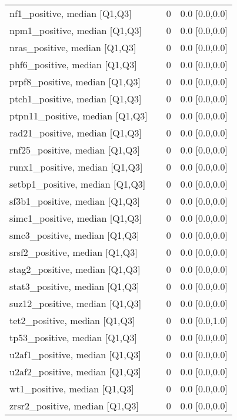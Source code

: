 \begin{tabular}{llll}
nf1\_positive, median [Q1,Q3] &    &      0 &     0.0 [0.0,0.0] \\
npm1\_positive, median [Q1,Q3] &    &      0 &     0.0 [0.0,0.0] \\
nras\_positive, median [Q1,Q3] &    &      0 &     0.0 [0.0,0.0] \\
phf6\_positive, median [Q1,Q3] &    &      0 &     0.0 [0.0,0.0] \\
prpf8\_positive, median [Q1,Q3] &    &      0 &     0.0 [0.0,0.0] \\
ptch1\_positive, median [Q1,Q3] &    &      0 &     0.0 [0.0,0.0] \\
ptpn11\_positive, median [Q1,Q3] &    &      0 &     0.0 [0.0,0.0] \\
rad21\_positive, median [Q1,Q3] &    &      0 &     0.0 [0.0,0.0] \\
rnf25\_positive, median [Q1,Q3] &    &      0 &     0.0 [0.0,0.0] \\
runx1\_positive, median [Q1,Q3] &    &      0 &     0.0 [0.0,0.0] \\
setbp1\_positive, median [Q1,Q3] &    &      0 &     0.0 [0.0,0.0] \\
sf3b1\_positive, median [Q1,Q3] &    &      0 &     0.0 [0.0,0.0] \\
simc1\_positive, median [Q1,Q3] &    &      0 &     0.0 [0.0,0.0] \\
smc3\_positive, median [Q1,Q3] &    &      0 &     0.0 [0.0,0.0] \\
srsf2\_positive, median [Q1,Q3] &    &      0 &     0.0 [0.0,0.0] \\
stag2\_positive, median [Q1,Q3] &    &      0 &     0.0 [0.0,0.0] \\
stat3\_positive, median [Q1,Q3] &    &      0 &     0.0 [0.0,0.0] \\
suz12\_positive, median [Q1,Q3] &    &      0 &     0.0 [0.0,0.0] \\
tet2\_positive, median [Q1,Q3] &    &      0 &     0.0 [0.0,1.0] \\
tp53\_positive, median [Q1,Q3] &    &      0 &     0.0 [0.0,0.0] \\
u2af1\_positive, median [Q1,Q3] &    &      0 &     0.0 [0.0,0.0] \\
u2af2\_positive, median [Q1,Q3] &    &      0 &     0.0 [0.0,0.0] \\
wt1\_positive, median [Q1,Q3] &    &      0 &     0.0 [0.0,0.0] \\
zrsr2\_positive, median [Q1,Q3] &    &      0 &     0.0 [0.0,0.0] \\

\end{tabular}
